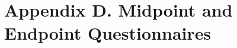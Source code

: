 
\chapter{Appendix D. Midpoint and Endpoint Questionnaires} %
\clearpage
\label{AppendixD} %


\clearpage


%

% 
